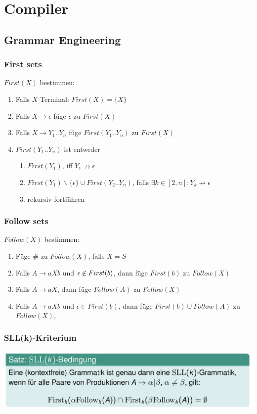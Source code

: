\section{Compiler}
\subsection{Grammar Engineering}
\subsubsection{First sets}
$First(X)$ bestimmen:
\begin{enumerate}
	\item Falls $X$ Terminal: $First(X) = \{X\}$
	\item Falls $X  \rightarrow \epsilon$ füge $\epsilon$ zu $First(X)$
	\item Falls $X \rightarrow Y_1..Y_n$ füge $First(Y_1..Y_n)$ zu $First(X)$
	\item $First(Y_1..Y_n)$ ist entweder
	\begin{enumerate}
		\item $First(Y_1)$, iff $Y_1  \nrightarrow \epsilon$
		\item $First(Y_1) \backslash \{\epsilon\} \cup First(Y_2..Y_n)$,  falls $\exists k \in [2,n]: Y_k \nrightarrow \epsilon$
		\item rekursiv fortführen
	\end{enumerate}
\end{enumerate}
\subsubsection{Follow sets}
$Follow(X)$ bestimmen:
\begin{enumerate}
	\item Füge $\#$ zu $Follow(X)$, falls $X=S$
	\item Falls $A \rightarrow aXb$ und $\epsilon \centernot\in First(b)$, dann füge $First(b)$ zu $Follow(X)$
	\item Falls $A \rightarrow aX$, dann füge $Follow(A)$ zu $Follow(X)$
	\item Falls $A \rightarrow aXb$ und $\epsilon \in First(b)$, dann füge $First(b) \cup Follow(A)$ zu $Follow(X)$, 
\end{enumerate} 
\subsubsection{SLL(k)-Kriterium}
\includegraphics[width=\columnwidth]{images/SSLk.png}
